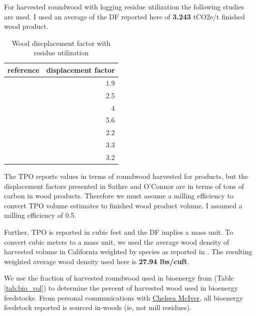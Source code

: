 \documentclass[a4paper]{article}
\begin{document}
For harvested roundwood with logging residue utilization the following
studies are used. I used an average of the DF reported here of \textbf{3.243} tCO2e/t finished
wood product.


\begin{table}[htb]
\centering
\begin{tabular}{lr}
reference & displacement factor\\
\hline
\citet{Eriksson2007} & 1.9\\
\citet{Eriksson2007} & 2.5\\
\citet{Gustavsson2006a} & 4\\
\citet{Gustavsson2006a} & 5.6\\
\citet{Gustavsson2006a} & 2.2\\
\citet{Gustavsson2006a} & 3.3\\
\citet{Pingoud2001} & 3.2\\
\end{tabular}
\caption{Wood discplacement factor with residue utilization \label{tab:df_inc_use}}

\end{table}



The TPO reports values in terms of roundwood harvested for products, but the
displacement factors presented in Sathre and O'Connor are in terms of
tons of carbon in wood products. Therefore we must assume a milling
efficiency to convert TPO volume estimates to finished wood product volume. I assumed
a milling efficiency of 0.5.


Further, TPO is reported in cubic feet and the DF implies a mass
unit. To convert cubic meters to a mass unit, we used the average wood
density of harvested volume in California weighted by species as reported 
in \citet{Mciver2012}. The resulting weighted average wood density used here is \textbf{27.94
lbs/cuft}.


We use the fraction of harvested roundwood used in bioenergy from \cite{Mciver2012} (Table \ref{tab:bio_vol})  to determine the percent of harvested wood used in bioenergy feedstocks. From personal communications with
\href{http://www.bber.umt.edu/staff/mciver.asp}{Chelsea McIver}, all bioenergy feedstock reported is sourced in-woods (ie, not mill residues).
\end{document}
